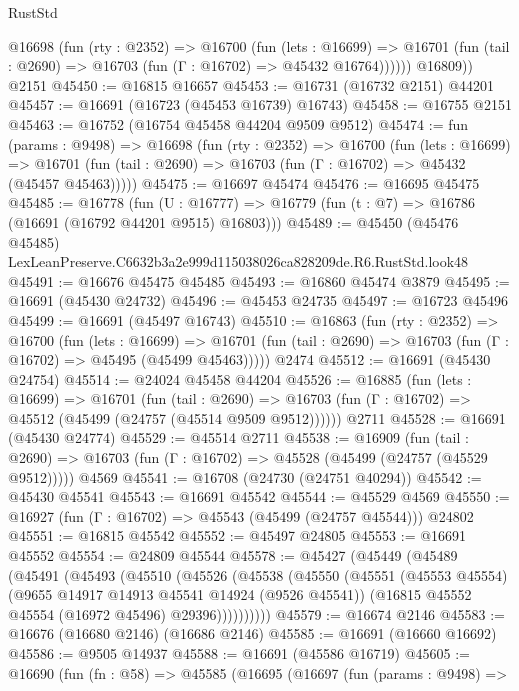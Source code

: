 \begin{lexlean}{RustStd}
\begin{coremodule}
          @16698
            (fun (rty : @2352) =>
            @16700
              (fun (lets : @16699) =>
              @16701 (fun (tail : @2690) => @16703 (fun (Γ : @16702) => @45432 @16764))))))
        @16809))
    @2151
@45450 := @16815 @16657
@45453 := @16731 (@16732 @2151) @44201
@45457 := @16691 (@16723 (@45453 @16739) @16743)
@45458 := @16755 @2151
@45463 := @16752 (@16754 @45458 @44204 @9509 @9512)
@45474 := fun (params : @9498) =>
  @16698
    (fun (rty : @2352) =>
    @16700
      (fun (lets : @16699) =>
      @16701 (fun (tail : @2690) => @16703 (fun (Γ : @16702) => @45432 (@45457 @45463)))))
@45475 := @16697 @45474
@45476 := @16695 @45475
@45485 := @16778
    (fun (U : @16777) => @16779 (fun (t : @7) => @16786 (@16691 (@16792 @44201 @9515) @16803)))
@45489 := @45450 (@45476 @45485) LexLeanPreserve.C6632b3a2e999d115038026ca828209de.R6.RustStd.look48
@45491 := @16676 @45475 @45485
@45493 := @16860 @45474 @3879
@45495 := @16691 (@45430 @24732)
@45496 := @45453 @24735
@45497 := @16723 @45496
@45499 := @16691 (@45497 @16743)
@45510 := @16863
    (fun (rty : @2352) =>
    @16700
      (fun (lets : @16699) =>
      @16701 (fun (tail : @2690) => @16703 (fun (Γ : @16702) => @45495 (@45499 @45463)))))
    @2474
@45512 := @16691 (@45430 @24754)
@45514 := @24024 @45458 @44204
@45526 := @16885
    (fun (lets : @16699) =>
    @16701
      (fun (tail : @2690) =>
      @16703 (fun (Γ : @16702) => @45512 (@45499 (@24757 (@45514 @9509 @9512))))))
    @2711
@45528 := @16691 (@45430 @24774)
@45529 := @45514 @2711
@45538 := @16909
    (fun (tail : @2690) => @16703 (fun (Γ : @16702) => @45528 (@45499 (@24757 (@45529 @9512)))))
    @4569
@45541 := @16708 (@24730 (@24751 @40294))
@45542 := @45430 @45541
@45543 := @16691 @45542
@45544 := @45529 @4569
@45550 := @16927 (fun (Γ : @16702) => @45543 (@45499 (@24757 @45544))) @24802
@45551 := @16815 @45542
@45552 := @45497 @24805
@45553 := @16691 @45552
@45554 := @24809 @45544
@45578 := @45427
    (@45449
      (@45489
        (@45491
          (@45493
            (@45510
              (@45526
                (@45538
                  (@45550
                    (@45551
                      (@45553 @45554)
                      (@9655 @14917 @14913 @45541 @14924 (@9526 @45541))
                      (@16815 @45552 @45554 (@16972 @45496) @29396))))))))))
@45579 := @16674 @2146
@45583 := @16676 (@16680 @2146) (@16686 @2146)
@45585 := @16691 (@16660 @16692)
@45586 := @9505 @14937
@45588 := @16691 (@45586 @16719)
@45605 := @16690
    (fun (fn : @58) =>
    @45585
      (@16695
        (@16697
          (fun (params : @9498) =>

\end{coremodule}
\end{lexlean}
